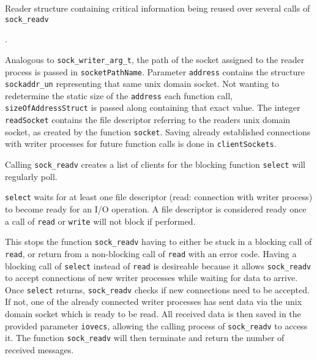 \begin{algorithm}[h!]
    
    \caption[Socket: Reader structure]{Reader structure containing critical information being reused over several calls of \texttt{sock\_readv}}.
    \label{alg:sock:read:args}
\end{algorithm}

Analogous to \texttt{sock\_writer\_arg\_t}, the path of the socket assigned to the reader process is passed in \texttt{socketPathName}.
Parameter \texttt{address} contains the structure \texttt{sockaddr\_un} representing that same unix domain socket.
Not wanting to redetermine the static size of the \texttt{address} each function call, \texttt{sizeOfAddressStruct} is passed along containing that exact value.
The integer \texttt{readSocket} contains the file descriptor referring to the readers unix domain socket, as created by the function \texttt{socket}.
Saving already established connections with writer processes for future function calls is done in \texttt{clientSockets}.

Calling \texttt{sock\_readv} creates a list of clients for the blocking function \texttt{select} will regularly poll.

\texttt{select} waits for at least one file descriptor (read: connection with writer process) to become ready for an I/O operation.
A file descriptor is considered ready once a call of \texttt{read} or \texttt{write} will not block if performed.\cite{man:select}

This stops the function \texttt{sock\_readv} having to either be stuck in a blocking call of \texttt{read}, or return from a non-blocking call of \texttt{read} with an error code.
Having a blocking call of \texttt{select} instead of \texttt{read} is desireable because it allows \texttt{sock\_readv} to accept connections of new writer processes while waiting for data to arrive.
Once \texttt{select} returns, \texttt{sock\_readv} checks if new connections need to be accepted.
If not, one of the already connected writer processes has sent data via the unix domain socket which is ready to be read.
All received data is then saved in the provided parameter \texttt{iovecs}, allowing the calling process of \texttt{sock\_readv} to access it.
The function \texttt{sock\_readv} will then terminate and return the number of received messages.
